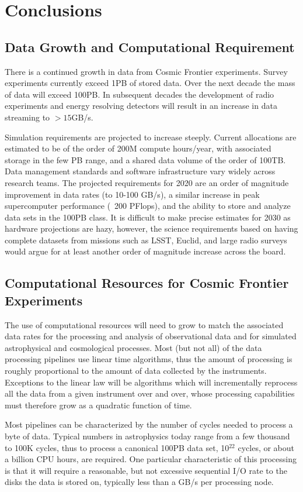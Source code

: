 \section{Conclusions}

\subsection{Data Growth and Computational Requirement}
There is a continued growth in data from Cosmic Frontier
experiments. Survey experiments currently exceed 1PB of stored
data. Over the next decade the mass of data will exceed 100PB. In
subsequent decades the development of radio experiments and energy
resolving detectors will result in an increase in data streaming to
$> 15$GB/s.

Simulation requirements are projected to increase steeply. Current
allocations are estimated to be of the order of 200M compute
hours/year, with associated storage in the few PB range, and a shared
data volume of the order of 100TB. Data management standards and
software infrastructure vary widely across research teams. The
projected requirements for 2020 are an order of magnitude improvement
in data rates (to 10-100 GB/s), a similar increase in peak
supercomputer performance (~200 PFlops), and the ability to store and
analyze data sets in the 100PB class. It is difficult to make precise
estimates for 2030 as hardware projections are hazy, however, the
science requirements based on having complete datasets from missions
such as LSST, Euclid, and large radio surveys would argue for at least
another order of magnitude increase across the board.

\subsection{Computational Resources for Cosmic Frontier Experiments}  
The use of computational resources will need to grow to match the
associated data rates for the processing and analysis of observational
data and for simulated astrophysical and cosmological processes. Most
(but not all) of the data processing pipelines use linear time
algorithms, thus the amount of processing is roughly proportional to
the amount of data collected by the instruments. Exceptions to the
linear law will be algorithms which will incrementally reprocess all
the data from a given instrument over and over, whose processing
capabilities must therefore grow as a quadratic function of time.

Most pipelines can be characterized by the number of cycles needed to
process a byte of data. Typical numbers in astrophysics today range
from a few thousand to 100K cycles, thus to process a canonical 100PB
data set, 10$^{22}$ cycles, or about a billion CPU hours, are
required. One particular characteristic of this processing is that it
will require a reasonable, but not excessive sequential I/O rate to
the disks the data is stored on, typically less than a GB/s per
processing node.

